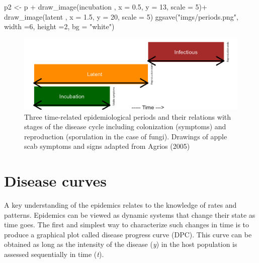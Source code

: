\documentclass[
  letterpaper,
]{book}
\newenvironment{Shaded}{\begin{snugshade}}{\end{snugshade}}
\newcommand{\AttributeTok}[1]{\textcolor[rgb]{0.40,0.45,0.13}{#1}}
\newcommand{\DecValTok}[1]{\textcolor[rgb]{0.68,0.00,0.00}{#1}}
\newcommand{\FloatTok}[1]{\textcolor[rgb]{0.68,0.00,0.00}{#1}}
\newcommand{\FunctionTok}[1]{\textcolor[rgb]{0.28,0.35,0.67}{#1}}
\newcommand{\NormalTok}[1]{\textcolor[rgb]{0.00,0.23,0.31}{#1}}
\newcommand{\OtherTok}[1]{\textcolor[rgb]{0.00,0.23,0.31}{#1}}
\newcommand{\SpecialCharTok}[1]{\textcolor[rgb]{0.37,0.37,0.37}{#1}}
\newcommand{\StringTok}[1]{\textcolor[rgb]{0.13,0.47,0.30}{#1}}
\begin{document}
\begin{Shaded}
\begin{Highlighting}[]
\NormalTok{  p2 }\OtherTok{\textless{}{-}}\NormalTok{ p }\SpecialCharTok{+} \FunctionTok{draw\_image}\NormalTok{(incubation , }\AttributeTok{x =} \FloatTok{0.5}\NormalTok{, }\AttributeTok{y =} \DecValTok{13}\NormalTok{, }\AttributeTok{scale =} \DecValTok{5}\NormalTok{)}\SpecialCharTok{+}
    \FunctionTok{draw\_image}\NormalTok{(latent , }\AttributeTok{x =} \FloatTok{1.5}\NormalTok{, }\AttributeTok{y =} \DecValTok{20}\NormalTok{, }\AttributeTok{scale =} \DecValTok{5}\NormalTok{)}
  \FunctionTok{ggsave}\NormalTok{(}\StringTok{"imgs/periods.png"}\NormalTok{, }\AttributeTok{width =}\DecValTok{6}\NormalTok{, }\AttributeTok{height =}\DecValTok{2}\NormalTok{, }\AttributeTok{bg =} \StringTok{"white"}\NormalTok{)  }
\end{Highlighting}
\end{Shaded}

\begin{figure}

{\centering \includegraphics{imgs/periods.png}

}

\caption{\label{fig-periods}Three time-related epidemiological periods
and their relations with stages of the disease cycle including
colonization (symptoms) and reproduction (sporulation in the case of
fungi). Drawings of apple scab symptoms and signs adapted from Agrios
(2005)}

\end{figure}

\hypertarget{disease-curves}{%
\section{Disease curves}\label{disease-curves}}

A key understanding of the epidemics relates to the knowledge of rates
and patterns. Epidemics can be viewed as dynamic systems that change
their state as time goes. The first and simplest way to characterize
such changes in time is to produce a graphical plot called disease
progress curve (DPC). This curve can be obtained as long as the
intensity of the disease (\emph{y}) in the host population is assessed
sequentially in time (\emph{t}).
\end{document}
